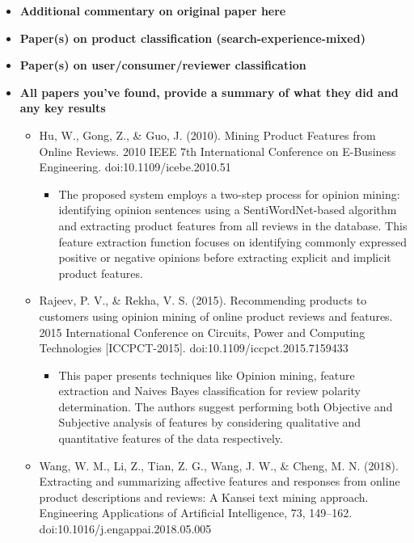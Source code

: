 \documentclass[
  letterpaper,
  DIV=11,
  numbers=noendperiod]{scrreprt}
\providecommand{\tightlist}{%
  \setlength{\itemsep}{0pt}\setlength{\parskip}{0pt}}\usepackage{longtable,booktabs,array}
\begin{document}
\begin{itemize}
\item
  \textbf{Additional commentary on original paper here}
\item
  \textbf{Paper(s) on product classification (search-experience-mixed)}
\item
  \textbf{Paper(s) on user/consumer/reviewer classification}
\item
  \textbf{All papers you've found, provide a summary of what they did
  and any key results}

  \begin{itemize}
  \item
    Hu, W., Gong, Z., \& Guo, J. (2010). Mining Product Features from
    Online Reviews. 2010 IEEE 7th International Conference on E-Business
    Engineering. doi:10.1109/icebe.2010.51

    \begin{itemize}
    \tightlist
    \item
      The proposed system employs a two-step process for opinion mining:
      identifying opinion sentences using a SentiWordNet-based algorithm
      and extracting product features from all reviews in the database.
      This feature extraction function focuses on identifying commonly
      expressed positive or negative opinions before extracting explicit
      and implicit product features.
    \end{itemize}
  \item
    Rajeev, P. V., \& Rekha, V. S. (2015). Recommending products to
    customers using opinion mining of online product reviews and
    features. 2015 International Conference on Circuits, Power and
    Computing Technologies {[}ICCPCT-2015{]}.
    doi:10.1109/iccpct.2015.7159433

    \begin{itemize}
    \tightlist
    \item
      This paper presents techniques like Opinion mining, feature
      extraction and Naives Bayes classification for review polarity
      determination. The authors suggest performing both Objective and
      Subjective analysis of features by considering qualitative and
      quantitative features of the data respectively.
    \end{itemize}
  \item
    Wang, W. M., Li, Z., Tian, Z. G., Wang, J. W., \& Cheng, M. N.
    (2018). Extracting and summarizing affective features and responses
    from online product descriptions and reviews: A Kansei text mining
    approach. Engineering Applications of Artificial Intelligence, 73,
    149--162. doi:10.1016/j.engappai.2018.05.005


\end{itemize}
\end{itemize}
\end{document}
